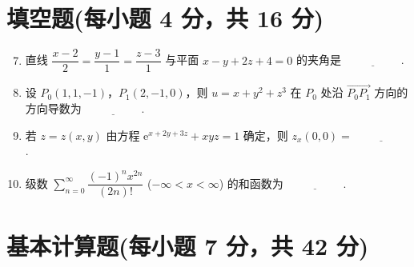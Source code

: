 \documentclass[../main.tex]{subfiles}
\begin{document}
\section{填空题(每小题 4 分，共 16 分)}
\begin{enumerate}
    \setcounter{enumi}{6}
    \item 直线 \( \dfrac{x-2}{2} = \dfrac{y-1}{1} = \dfrac{z-3}{1} \) 与平面 \( x - y + 2z + 4 = 0 \) 的夹角是 \(\underline{\hspace{5em}}\).
          \vspace{1em}

    \item 设 \( P_0(1,1,-1) \)，\( P_1(2,-1,0) \)，则 \( u = x + y^2 + z^3 \) 在 \( P_0 \) 处沿 \( \overrightarrow{P_0P_1} \) 方向的方向导数为 \(\underline{\hspace{5em}}\).
          \vspace{1em}

    \item 若 \( z = z(x,y) \) 由方程 \( \mathrm{e}^{x+2y+3z} + xyz = 1 \) 确定，则 \( z_x(0,0) = \underline{\hspace{5em}}\).
          \vspace{1em}

    \item 级数 \( \sum \limits_{n=0}^{\infty} \dfrac{(-1)^n x^{2n}}{(2n)!} \) (\( -\infty < x < \infty \)) 的和函数为 \(\underline{\hspace{5em}}\).
          \vspace{1em}
\end{enumerate}

\section{基本计算题(每小题 7 分，共 42 分)}
\end{document}
